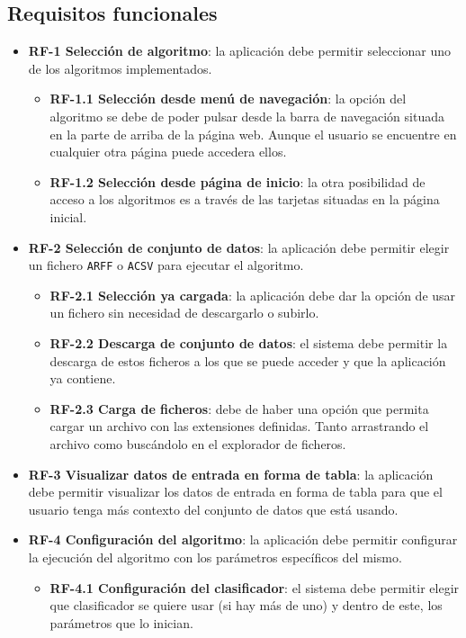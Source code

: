 \subsection{Requisitos funcionales}

\begin{itemize}
	\item \textbf{RF-1 Selección de algoritmo}: la aplicación debe
	permitir seleccionar uno de los algoritmos implementados.
	\begin{itemize}
		\item \textbf{RF-1.1 Selección desde menú de navegación}: la opción del algoritmo se debe de poder pulsar desde la barra de navegación situada en la parte de arriba de la página web. Aunque el usuario se encuentre en cualquier otra página puede accedera ellos.
		\item \textbf{RF-1.2 Selección desde página de inicio}: la otra posibilidad de acceso a los algoritmos es a través de las tarjetas situadas en la página inicial.
	\end{itemize}
	\item \textbf{RF-2 Selección de conjunto de datos}: la aplicación debe
	permitir elegir un fichero \texttt{ARFF} o \texttt{ACSV} para ejecutar el algoritmo.
	\begin{itemize}
		\item \textbf{RF-2.1 Selección ya cargada}: la aplicación debe dar la opción de usar un fichero sin necesidad de descargarlo o subirlo.
		\item \textbf{RF-2.2 Descarga de conjunto de datos}: el sistema debe permitir la descarga de estos ficheros a los que se puede acceder y que la aplicación ya contiene.
		\item \textbf{RF-2.3 Carga de ficheros}: debe de haber una opción que permita cargar un archivo con las extensiones definidas. Tanto arrastrando el archivo como buscándolo en el explorador de ficheros.
	\end{itemize} 
	\item \textbf{RF-3 Visualizar datos de entrada en forma de tabla}: la aplicación debe permitir visualizar los datos de entrada en forma de tabla para que el usuario tenga más contexto del conjunto de datos que está usando.
	\item \textbf{RF-4 Configuración del algoritmo}: la aplicación debe	permitir configurar la ejecución del algoritmo con los parámetros específicos del mismo.
	\begin{itemize}
		\item \textbf{RF-4.1 Configuración del clasificador}: el sistema debe permitir elegir que clasificador se quiere usar (si hay más de uno) y dentro de este, los parámetros que lo inician.

\end{itemize}
\end{itemize}
